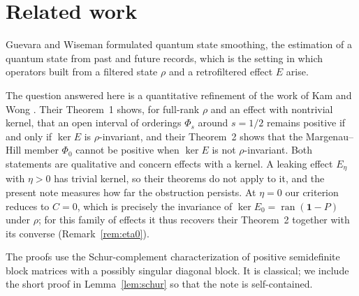 \documentclass[11pt,a4paper]{article}
\theoremstyle{definition}
\theoremstyle{plain}
\DeclareMathOperator{\ran}{ran}
\newcommand{\one}{\mathbf{1}}
\begin{document}
\section{Related work}\label{sec:related}
Guevara and Wiseman
\cite{Guevara2015} formulated quantum state smoothing, the estimation of a
quantum state from past and future records, which is the setting in which
operators built from a filtered state $\rho$ and a retrofiltered effect $E$
arise.

The question answered here is a quantitative refinement of the work of Kam and
Wong \cite{KamWong2026}. Their Theorem~1 shows, for full-rank $\rho$ and an
effect with nontrivial kernel, that an open interval of orderings $\Phi_s$
around $s=1/2$ remains positive if and only if $\ker E$ is $\rho$-invariant, and
their Theorem~2 shows that the Margenau--Hill member $\Phi_0$ cannot be positive
when $\ker E$ is not $\rho$-invariant. Both statements are qualitative and
concern effects with a kernel. A leaking effect $E_\eta$ with $\eta>0$ has
trivial kernel, so their theorems do not apply to it, and the present note
measures how far the obstruction persists. At $\eta=0$ our criterion reduces
to $C=0$, which is precisely the invariance of $\ker E_0=\ran(\one-P)$ under
$\rho$; for this family of effects it thus recovers their Theorem~2 together
with its converse (Remark~\ref{rem:eta0}).

The proofs use the Schur-complement characterization of positive semidefinite
block matrices with a possibly singular diagonal block. It is classical; we
include the short proof in Lemma~\ref{lem:schur} so that the note is
self-contained.
\end{document}
